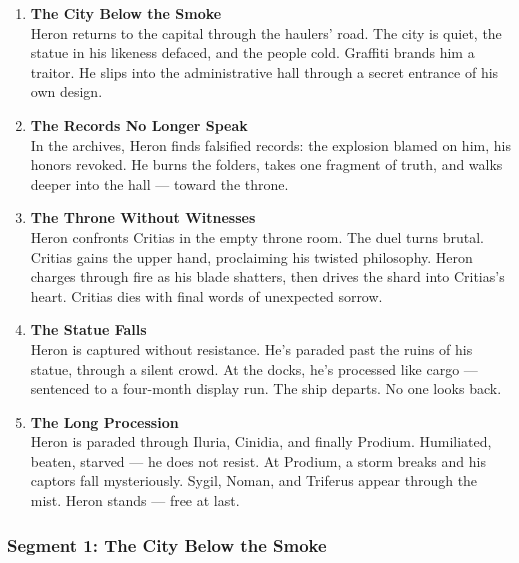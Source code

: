 \documentclass[9pt]{article}
\begin{document}
\begin{center}
\begin{enumerate}
    \item \textbf{The City Below the Smoke} \\
    Heron returns to the capital through the haulers’ road. The city is quiet, the statue in his likeness defaced, and the people cold. Graffiti brands him a traitor. He slips into the administrative hall through a secret entrance of his own design.

    \vspace{.3in}
    \item \textbf{The Records No Longer Speak} \\
    In the archives, Heron finds falsified records: the explosion blamed on him, his honors revoked. He burns the folders, takes one fragment of truth, and walks deeper into the hall — toward the throne.

    \vspace{.3in}
    \item \textbf{The Throne Without Witnesses} \\
    Heron confronts Critias in the empty throne room. The duel turns brutal. Critias gains the upper hand, proclaiming his twisted philosophy. Heron charges through fire as his blade shatters, then drives the shard into Critias’s heart. Critias dies with final words of unexpected sorrow.

    \vspace{.3in}
    \item \textbf{The Statue Falls} \\
    Heron is captured without resistance. He’s paraded past the ruins of his statue, through a silent crowd. At the docks, he's processed like cargo — sentenced to a four-month display run. The ship departs. No one looks back.

    \vspace{.3in}
    \item \textbf{The Long Procession} \\
    Heron is paraded through Iluria, Cinidia, and finally Prodium. Humiliated, beaten, starved — he does not resist. At Prodium, a storm breaks and his captors fall mysteriously. Sygil, Noman, and Triferus appear through the mist. Heron stands — free at last.
\end{enumerate}
\end{center}

\newpage

\subsubsection*{Segment 1: The City Below the Smoke}
\end{document}
